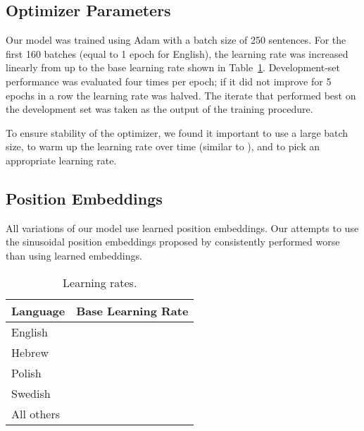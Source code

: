 \documentclass[11pt,a4paper]{article}
\begin{document}
\subsection{Optimizer Parameters}

Our model was trained using Adam with a batch size of 250 sentences. For the first 160 batches (equal to 1 epoch for English), the learning rate was increased linearly from  up to the base learning rate shown in Table~\ref{table:lr}. Development-set performance was evaluated four times per epoch; if it did not improve for 5 epochs in a row the learning rate was halved. The iterate that performed best on the development set was taken as the output of the training procedure.

To ensure stability of the optimizer, we found it important to use a large batch size, to warm up the learning rate over time (similar to \citet{vaswani_attention_2017}), and to pick an appropriate learning rate.

\subsection{Position Embeddings}

All variations of our model use learned position embeddings. Our attempts to use the sinusoidal position embeddings proposed by \citet{vaswani_attention_2017} consistently performed worse than using learned embeddings.

\begin{table}
\begin{center}
\begin{tabular}{@{}ll@{}}
\toprule
Language & Base Learning Rate \\
\midrule
English &  \\
Hebrew &  \\
Polish &  \\
Swedish &  \\
All others &  \\
\bottomrule
\end{tabular}
\end{center}
\caption{
\label{table:lr}
Learning rates.
}
\end{table}
\end{document}
